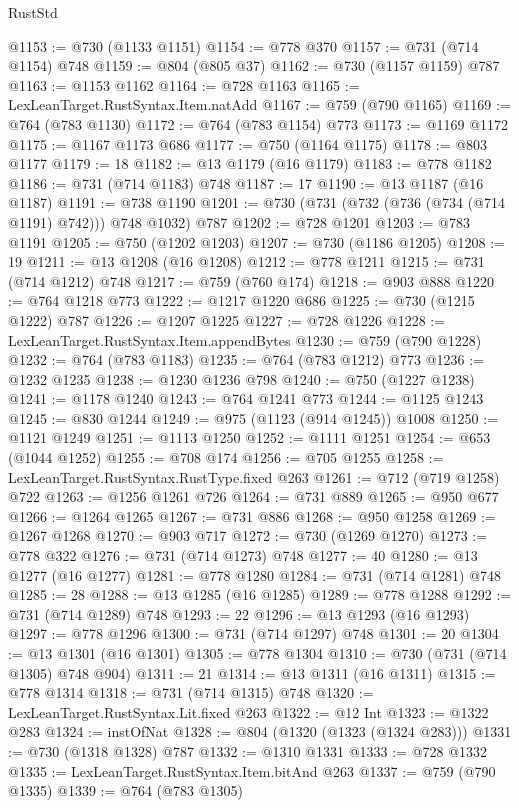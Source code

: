 \begin{lexlean}{RustStd}
\begin{coremodule}
@1153 := @730 (@1133 @1151)
@1154 := @778 @370
@1157 := @731 (@714 @1154) @748
@1159 := @804 (@805 @37)
@1162 := @730 (@1157 @1159) @787
@1163 := @1153 @1162
@1164 := @728 @1163
@1165 := LexLeanTarget.RustSyntax.Item.natAdd
@1167 := @759 (@790 @1165)
@1169 := @764 (@783 @1130)
@1172 := @764 (@783 @1154) @773
@1173 := @1169 @1172
@1175 := @1167 @1173 @686
@1177 := @750 (@1164 @1175)
@1178 := @803 @1177
@1179 := 18
@1182 := @13 @1179 (@16 @1179)
@1183 := @778 @1182
@1186 := @731 (@714 @1183) @748
@1187 := 17
@1190 := @13 @1187 (@16 @1187)
@1191 := @738 @1190
@1201 := @730 (@731 (@732 (@736 (@734 (@714 @1191) @742))) @748 @1032) @787
@1202 := @728 @1201
@1203 := @783 @1191
@1205 := @750 (@1202 @1203)
@1207 := @730 (@1186 @1205)
@1208 := 19
@1211 := @13 @1208 (@16 @1208)
@1212 := @778 @1211
@1215 := @731 (@714 @1212) @748
@1217 := @759 (@760 @174)
@1218 := @903 @888
@1220 := @764 @1218 @773
@1222 := @1217 @1220 @686
@1225 := @730 (@1215 @1222) @787
@1226 := @1207 @1225
@1227 := @728 @1226
@1228 := LexLeanTarget.RustSyntax.Item.appendBytes
@1230 := @759 (@790 @1228)
@1232 := @764 (@783 @1183)
@1235 := @764 (@783 @1212) @773
@1236 := @1232 @1235
@1238 := @1230 @1236 @798
@1240 := @750 (@1227 @1238)
@1241 := @1178 @1240
@1243 := @764 @1241 @773
@1244 := @1125 @1243
@1245 := @830 @1244
@1249 := @975 (@1123 (@914 @1245)) @1008
@1250 := @1121 @1249
@1251 := @1113 @1250
@1252 := @1111 @1251
@1254 := @653 (@1044 @1252)
@1255 := @708 @174
@1256 := @705 @1255
@1258 := LexLeanTarget.RustSyntax.RustType.fixed @263
@1261 := @712 (@719 @1258) @722
@1263 := @1256 @1261 @726
@1264 := @731 @889
@1265 := @950 @677
@1266 := @1264 @1265
@1267 := @731 @886
@1268 := @950 @1258
@1269 := @1267 @1268
@1270 := @903 @717
@1272 := @730 (@1269 @1270)
@1273 := @778 @322
@1276 := @731 (@714 @1273) @748
@1277 := 40
@1280 := @13 @1277 (@16 @1277)
@1281 := @778 @1280
@1284 := @731 (@714 @1281) @748
@1285 := 28
@1288 := @13 @1285 (@16 @1285)
@1289 := @778 @1288
@1292 := @731 (@714 @1289) @748
@1293 := 22
@1296 := @13 @1293 (@16 @1293)
@1297 := @778 @1296
@1300 := @731 (@714 @1297) @748
@1301 := 20
@1304 := @13 @1301 (@16 @1301)
@1305 := @778 @1304
@1310 := @730 (@731 (@714 @1305) @748 @904)
@1311 := 21
@1314 := @13 @1311 (@16 @1311)
@1315 := @778 @1314
@1318 := @731 (@714 @1315) @748
@1320 := LexLeanTarget.RustSyntax.Lit.fixed @263
@1322 := @12 Int
@1323 := @1322 @283
@1324 := instOfNat
@1328 := @804 (@1320 (@1323 (@1324 @283)))
@1331 := @730 (@1318 @1328) @787
@1332 := @1310 @1331
@1333 := @728 @1332
@1335 := LexLeanTarget.RustSyntax.Item.bitAnd @263
@1337 := @759 (@790 @1335)
@1339 := @764 (@783 @1305)

\end{coremodule}
\end{lexlean}
